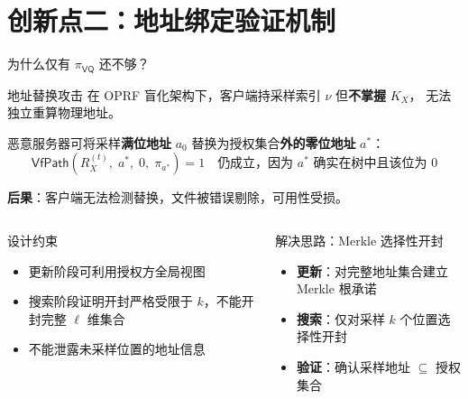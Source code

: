 \section{创新点二：地址绑定验证机制}

\begin{frame}{为什么仅有 $\pi_\mathsf{VQ}$ 还不够？}

  \begin{alertblock}{地址替换攻击}
    在 OPRF 盲化架构下，客户端持采样索引 $\nu$ 但\textbf{不掌握} $K_X$，
    无法独立重算物理地址。

    \medskip
    恶意服务器可将采样\textbf{满位地址} $a_0$
    替换为授权集合\textbf{外的零位地址} $a^*$：
    \[
      \mathsf{VfPath}(R_X^{(t)},\; a^*,\; 0,\; \pi_{a^*}) = 1
      \quad\text{仍成立，因为 }a^*\text{ 确实在树中且该位为 }0
    \]

    \textbf{后果}：客户端无法检测替换，文件被错误剔除，可用性受损。
  \end{alertblock}

  \vspace{0.3em}

  \begin{columns}[T]
      \begin{block}{设计约束}
        \begin{itemize}
          \item 更新阶段可利用授权方全局视图
          \item 搜索阶段证明开封严格受限于 $k$，不能开封完整 $\ell$ 维集合
          \item 不能泄露未采样位置的地址信息
        \end{itemize}
      \end{block}
      \begin{exampleblock}{解决思路：Merkle 选择性开封}
        \begin{itemize}
          \item \textbf{更新}：对完整地址集合建立 Merkle 根承诺
          \item \textbf{搜索}：仅对采样 $k$ 个位置选择性开封
          \item \textbf{验证}：确认采样地址 $\subseteq$ 授权集合
        \end{itemize}
      \end{exampleblock}
  \end{columns}

\end{frame}


